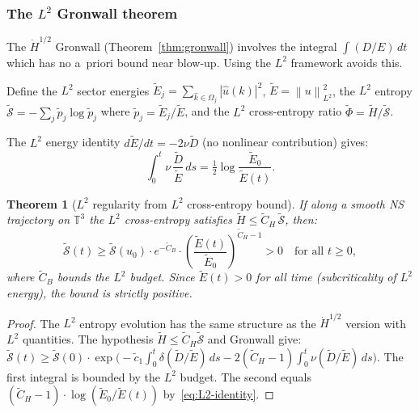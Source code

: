 \documentclass[11pt]{article}
\newtheorem{theorem}{Theorem}[section]
\theoremstyle{definition}
\newcommand{\T}{\mathbb{T}}
\newcommand{\norm}[1]{\left\| #1 \right\|}
\newcommand{\Hdot}[1]{\dot{H}^{#1}}
\newcommand{\cS}{\mathcal{S}}
\begin{document}
\subsubsection{The $L^2$ Gronwall theorem}

The $\Hdot{1/2}$ Gronwall
(Theorem~\ref{thm:gronwall}) involves the integral
$\int(D/E)\,dt$ which has no a~priori bound near blow-up.
Using the $L^2$ framework avoids this.

Define the $L^2$ sector energies
$\widetilde{E}_j = \sum_{\hat{k}\in\Omega_j}|\hat{u}(k)|^2$,
$\widetilde{E} = \norm{u}_{L^2}^2$,
the $L^2$ entropy
$\widetilde{\cS} = -\sum_j \tilde{p}_j\log\tilde{p}_j$
where $\tilde{p}_j = \widetilde{E}_j/\widetilde{E}$,
and the $L^2$ cross-entropy ratio
$\widetilde\Phi = \widetilde{H}/\widetilde{\cS}$.

The $L^2$ energy identity
$d\widetilde{E}/dt = -2\nu\widetilde{D}$
(no nonlinear contribution) gives:
\begin{equation}\label{eq:L2-identity}
\int_0^t \nu\,\frac{\widetilde{D}}{\widetilde{E}}\,ds
= \tfrac{1}{2}\log\frac{\widetilde{E}_0}{\widetilde{E}(t)}.
\end{equation}

\begin{theorem}[$L^2$ regularity from $L^2$ cross-entropy bound]
\label{thm:L2-gronwall}
If along a smooth NS trajectory on $\T^3$ the
$L^2$ cross-entropy satisfies
$\widetilde{H} \leq \widetilde{C}_H\,\widetilde{\cS}$,
then:
\begin{equation}\label{eq:L2-gronwall}
\widetilde{\cS}(t)
\geq \widetilde{\cS}(u_0)\cdot
e^{-\widetilde{C}_B}
\cdot\left(\frac{\widetilde{E}(t)}{\widetilde{E}_0}
\right)^{\widetilde{C}_H - 1} > 0
\quad\text{for all } t \geq 0,
\end{equation}
where $\widetilde{C}_B$ bounds the $L^2$ budget.
Since $\widetilde{E}(t) > 0$ for all time
(subcriticality of $L^2$ energy), the bound is
strictly positive.
\end{theorem}

\begin{proof}
The $L^2$ entropy evolution has the same structure as
the $\Hdot{1/2}$ version with $L^2$ quantities.
The hypothesis
$\widetilde{H} \leq \widetilde{C}_H\widetilde{\cS}$
and Gronwall give:
$\widetilde{\cS}(t) \geq \widetilde{\cS}(0)\cdot
\exp\bigl(-\widetilde{c}_1\int_0^t
\delta(\widetilde{D}/\widetilde{E})\,ds
-2(\widetilde{C}_H-1)
\int_0^t\nu(\widetilde{D}/\widetilde{E})\,ds\bigr)$.
The first integral is bounded by the $L^2$ budget.
The second equals
$(\widetilde{C}_H-1)\cdot\log(\widetilde{E}_0/
\widetilde{E}(t))$ by~\eqref{eq:L2-identity}.
\end{proof}
\end{document}
